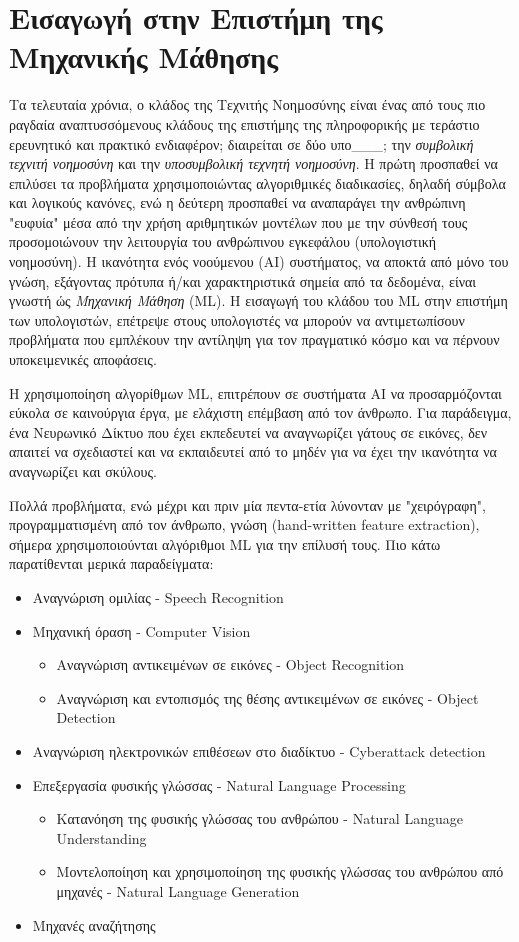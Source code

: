 \section{Εισαγωγή στην Επιστήμη της Μηχανικής Μάθησης}
\label{sec:theory_ml}

Τα τελευταία χρόνια, ο κλάδος της Τεχνιτής Νοημοσύνης είναι ένας από τους πιο ραγδαία
αναπτυσσόμενους κλάδους της επιστήμης της πληροφορικής με τεράστιο
ερευνητικό και πρακτικό ενδιαφέρον; διαιρείται σε δύο υπο\_\_\_; την \emph{συμβολική τεχνιτή
νοημοσύνη} και την \emph{υποσυμβολική τεχνητή νοημοσύνη}. Η πρώτη προσπαθεί να
επιλύσει τα προβλήματα χρησιμοποιώντας αλγοριθμικές διαδικασίες, δηλαδή
σύμβολα και λογικούς κανόνες, ενώ η δεύτερη προσπαθεί να αναπαράγει την
ανθρώπινη "ευφυία" μέσα από την χρήση αριθμητικών μοντέλων
που με την σύνθεσή τους προσομοιώνουν την λειτουργία του ανθρώπινου εγκεφάλου
(υπολογιστική νοημοσύνη).
Η ικανότητα ενός νοούμενου (AI) συστήματος, να αποκτά από μόνο του γνώση,
εξάγοντας πρότυπα ή/και χαρακτηριστικά σημεία από τα δεδομένα,
είναι γνωστή ώς \emph{Μηχανική Μάθηση} (ML).
Η εισαγωγή του κλάδου του ML στην επιστήμη των υπολογιστών,
επέτρεψε στους υπολογιστές να μπορούν να αντιμετωπίσουν προβλήματα που εμπλέκουν
την αντίληψη για τον πραγματικό κόσμο και να πέρνουν υποκειμενικές αποφάσεις.

Η χρησιμοποίηση αλγορίθμων ML, επιτρέπουν σε συστήματα AI
να προσαρμόζονται εύκολα σε καινούργια έργα, με ελάχιστη επέμβαση από τον άνθρωπο.
Για παράδειγμα, ένα Νευρωνικό Δίκτυο που έχει εκπεδευτεί να αναγνωρίζει γάτους σε εικόνες,
δεν απαιτεί να σχεδιαστεί και να εκπαιδευτεί από το μηδέν για να έχει την ικανότητα
να αναγνωρίζει και σκύλους.

Πολλά προβλήματα, ενώ μέχρι και πριν μία πεντα-ετία λύνονταν με
"χειρόγραφη", προγραμματισμένη από τον άνθρωπο, γνώση
(hand-written feature extraction), σήμερα χρησιμοποιούνται
αλγόριθμοι ML για την επίλυσή τους. Πιο κάτω παρατίθενται μερικά
παραδείγματα:
\begin{itemize}
  \item{Αναγνώριση ομιλίας - Speech Recognition}
  \item{Μηχανική όραση - Computer Vision}
  \begin{itemize}
    \item{Αναγνώριση αντικειμένων σε εικόνες - Object Recognition}
    \item{Αναγνώριση και εντοπισμός της θέσης αντικειμένων σε εικόνες - Object Detection}
  \end{itemize}
  \item{Αναγνώριση ηλεκτρονικών επιθέσεων στο διαδίκτυο - Cyberattack detection}
  \item{Επεξεργασία φυσικής γλώσσας - Natural Language Processing}
  \begin{itemize}
    \item{Κατανόηση της φυσικής γλώσσας του ανθρώπου - Natural Language Understanding}
    \item{Μοντελοποίηση και χρησιμοποίηση της φυσικής γλώσσας του ανθρώπου από μηχανές - Natural Language Generation}
  \end{itemize}
  \item{Μηχανές αναζήτησης}
\end{itemize}

